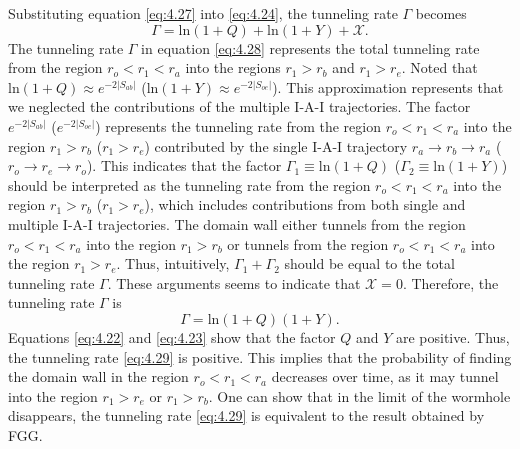 \documentclass[12pt]{article}
\begin{document}
Substituting equation \eqref{eq:4.27} into \eqref{eq:4.24}, the tunneling rate $\Gamma$ becomes
\begin{equation}
\label{eq:4.28}%
\Gamma=\mathrm{ln}(1+Q)+\mathrm{ln}(1+Y)+\mathscr{X}.
\end{equation}
The tunneling rate $\Gamma$ in equation \eqref{eq:4.28} represents the total tunneling rate from the region $r_{o}<r_{1}<r_{a}$ into the regions $r_{1}>r_{b}$ and $r_{1}>r_{e}$.  Noted that $\mathrm{ln}(1+Q)\approx e^{-2|S_{ab}|}$ ($\mathrm{ln}(1+Y)\approx e^{-2|S_{oe}|}$). This approximation represents that we neglected the contributions of the multiple I-A-I trajectories.  The factor $e^{-2|S_{ab}|}$ ($e^{-2|S_{oe}|}$) represents the tunneling rate from the region $r_{o}<r_{1}<r_{a}$ into the region $r_{1}>r_{b}$ ($r_{1}>r_{e}$) contributed by the single I-A-I trajectory $r_{a}\rightarrow r_{b}\rightarrow r_{a}$ ($r_{o}\rightarrow r_{e}\rightarrow r_{o}$). This indicates that the factor $\Gamma_{1}\equiv\mathrm{ln}(1+Q)$ ($\Gamma_{2}\equiv\mathrm{ln}(1+Y)$) should be interpreted as the tunneling rate from the region $r_{o}<r_{1}<r_{a}$ into the region $r_{1}>r_{b}$ ($r_{1}>r_{e}$), which includes contributions from both single and multiple I-A-I trajectories.
The domain wall \uppercase\expandafter{} either tunnels from the region $r_{o}<r_{1}<r_{a}$ into the region $r_{1}>r_{b}$ or tunnels from the region $r_{o}<r_{1}<r_{a}$ into the region $r_{1}>r_{e}$.  Thus, intuitively, $\Gamma_{1}+\Gamma_{2}$ should be equal to the total tunneling rate $\Gamma$. These arguments seems to indicate that $\mathscr{X}=0$. Therefore, the tunneling rate $\Gamma$ is
\begin{equation}
\label{eq:4.29}%
\Gamma=\mathrm{ln}(1+Q)(1+Y).
\end{equation}
Equations \eqref{eq:4.22} and \eqref{eq:4.23} show that the factor $Q$ and $Y$ are positive. Thus, the tunneling rate \eqref{eq:4.29} is positive. This implies that the probability of finding the domain wall \uppercase\expandafter{} in the region $r_{o}<r_{1}<r_{a}$ decreases over time, as it may tunnel into the region $r_{1}>r_{e}$ or $r_{1}>r_{b}$.
One can show that in the limit of the wormhole disappears, the tunneling rate \eqref{eq:4.29} is equivalent to the result obtained by FGG.
\end{document}

